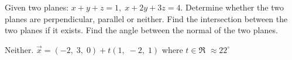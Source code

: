 
\begin{Exercise}[
name={},
title={}, 
difficulty=0,
origin={\cite{YL}}]
Given two planes: $x+y+z=1,\;x+2y+3z=4$.
\Question Determine whether the two planes are perpendicular, parallel or neither.
\Question Find the intersection between the two planes if it exists.
\Question Find the angle between the normal of the two planes.  
\end{Exercise}

\begin{Answer}
\Question Neither.
\Question $\vec{x}=(-2,\;3,\;0)+t(1,\;-2,\;1)$ where $t\in\Re$
\Question $\approx 22^{\circ}$
\end{Answer}

